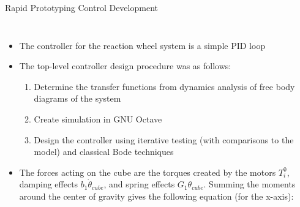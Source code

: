 \documentclass[slidestop,compress]{beamer}
\begin{document}
\begin{frame}[plain]
\begin{block}{\hspace{90 mm} Rapid Prototyping \hspace{210 mm} Control Development}
\begin{columns}
\hspace{-50 mm} 
\begin{itemize}
\item The controller for the reaction wheel system is a simple PID loop 
\item The top-level controller design procedure was as follows:
\begin{enumerate}
\item Determine the transfer functions from dynamics analysis of free body diagrams of the system
\item Create simulation in GNU Octave
\item Design the controller using iterative testing (with comparisons to the model) and classical Bode techniques
\end{enumerate}
\item The forces acting on the cube are the torques created by the motors $T_i^0$, damping effects $b_1 \dot{\theta}_{cube}$, and spring effects $G_1 \theta_{cube}$. Summing the moments around the center of gravity gives the following equation (for the x-axis):


\end{itemize}
\end{columns}
\end{block}
\end{frame}
\end{document}
